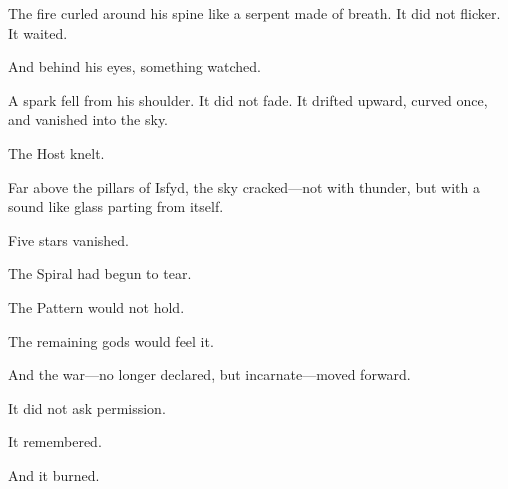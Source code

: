 \documentclass[9pt]{article}
\begin{document}
The fire curled around his spine like a serpent made of breath. It did not flicker. It waited.

And behind his eyes, something watched.

A spark fell from his shoulder. It did not fade. It drifted upward, curved once, and vanished into the sky.

The Host knelt.

Far above the pillars of Isfyd, the sky cracked—not with thunder, but with a sound like glass parting from itself.

Five stars vanished.

The Spiral had begun to tear.

The Pattern would not hold.

The remaining gods would feel it.

And the war—no longer declared, but incarnate—moved forward.

It did not ask permission.

It remembered.

And it burned.


\newpage
\end{document}
